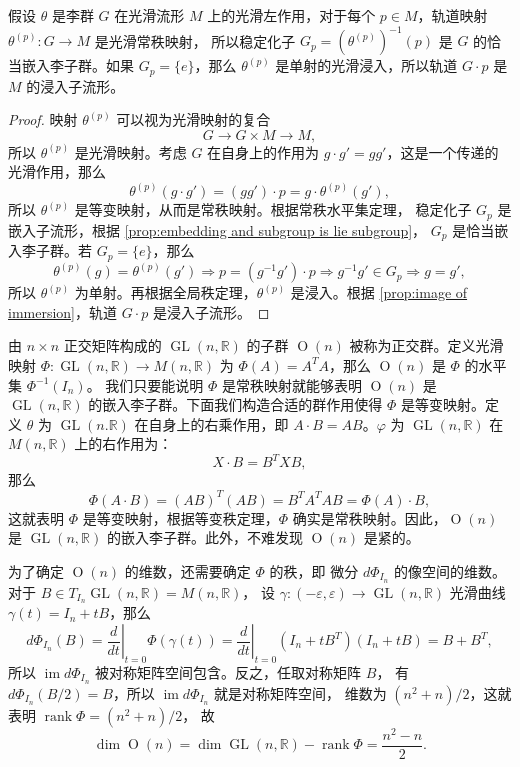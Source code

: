 \documentclass[fontset=none]{Notes}
\DeclareMathOperator\im{im}
\DeclareMathOperator\GL{GL}
\DeclareMathOperator\Orth{O}
\DeclareMathOperator\rk{rank}
\begin{document}
\begin{proposition}[轨道映射的性质]
  假设 $\theta$ 是李群 $G$ 在光滑流形 $M$ 上的光滑左作用，对于每个
  $p\in M$，轨道映射 $\theta^{(p)}:G\to M$ 是光滑常秩映射，
  所以稳定化子 $G_p=\left(\theta^{(p)}\right)^{-1}(p)$
  是 $G$ 的恰当嵌入李子群。如果 $G_p=\{e\}$，那么
  $\theta^{(p)}$ 是单射的光滑浸入，所以轨道 $G\cdot p$
  是 $M$ 的浸入子流形。
\end{proposition}
\begin{proof}
  映射 $\theta^{(p)}$ 可以视为光滑映射的复合
  \[
    G\to G\times M\to M,  
  \]
  所以 $\theta^{(p)}$ 是光滑映射。考虑 $G$ 在自身上的作用为
  $g\cdot g'=gg'$，这是一个传递的光滑作用，那么
  \[
    \theta^{(p)}(g\cdot g')=(gg')\cdot p=g\cdot \theta^{(p)}(g'),  
  \]
  所以 $\theta^{(p)}$ 是等变映射，从而是常秩映射。根据常秩水平集定理，
  稳定化子 $G_p$ 是嵌入子流形，根据 \autoref{prop:embedding and subgroup is lie subgroup}，
  $G_p$ 是恰当嵌入李子群。若 $G_p=\{e\}$，那么
  \[
    \theta^{(p)}(g)=\theta^{(p)}(g')\Rightarrow
    p=(g^{-1}g')\cdot p\Rightarrow g^{-1}  g'\in G_p
    \Rightarrow g=g',
  \]
  所以 $\theta^{(p)}$ 为单射。再根据全局秩定理，$\theta^{(p)}$
  是浸入。根据 \autoref{prop:image of immersion}，轨道 $G\cdot p$
  是浸入子流形。
\end{proof}

\begin{example}[正交群]\label{exa:orthogonal group}
  由 $n\times n$ 正交矩阵构成的 $\GL(n,\mathbb{R})$ 的子群 
  $\Orth(n)$ 被称为正交群。定义光滑映射 $\varPhi:\GL(n,\mathbb{R})\to M(n,\mathbb{R})$
  为 $\varPhi(A)=A^TA$，那么 $\Orth(n)$ 是 $\varPhi$ 的水平集 $\varPhi^{-1}(I_n)$。
  我们只要能说明 $\varPhi$ 是常秩映射就能够表明 $\Orth(n)$ 是 
  $\GL(n,\mathbb{R})$ 的嵌入李子群。下面我们构造合适的群作用使得
  $\varPhi$ 是等变映射。定义 $\theta$ 为 $\GL(n.\mathbb{R})$
  在自身上的右乘作用，即 $A\cdot B=AB$。$\varphi$
  为 $\GL(n,\mathbb{R})$ 在 $M(n,\mathbb{R})$ 上的右作用为：
  \[
    X\cdot B=B^TXB,  
  \]
  那么
  \[
    \varPhi(A\cdot B)=(AB)^T(AB)=B^TA^TAB=\varPhi(A)\cdot B ,
  \]
  这就表明 $\varPhi$ 是等变映射，根据等变秩定理，$\varPhi$
  确实是常秩映射。因此，$\Orth(n)$ 是 $\GL(n,\mathbb{R})$
  的嵌入李子群。此外，不难发现 $\Orth(n)$ 是紧的。

  为了确定 $\Orth(n)$ 的维数，还需要确定 $\varPhi$ 的秩，即
  微分 $d\varPhi_{I_n}$ 的像空间的维数。对于 $B\in T_{I_n}\GL(n,\mathbb{R})=M(n,\mathbb{R})$，
  设 $\gamma:(-\varepsilon,\varepsilon)\to \GL(n,\mathbb{R})$ 
  光滑曲线 $\gamma(t)=I_n+tB$，那么
  \[
    d\varPhi_{I_n}(B)=\left.\frac{d}{dt}\right|_{t=0}\varPhi(\gamma(t))
    =\left.\frac{d}{dt}\right|_{t=0}(I_n+tB^T)(I_n+tB)
    =B+B^T,
  \]
  所以 $\im d\varPhi_{I_n}$ 被对称矩阵空间包含。反之，任取对称矩阵 $B$，
  有 $d\varPhi_{I_n}(B/2)=B$，所以 $\im d\varPhi_{I_n}$ 就是对称矩阵空间，
  维数为 $(n^2+n)/2$，这就表明 $\rk \varPhi=(n^2+n)/2$，
  故
  \[
    \dim\Orth(n)=\dim\GL(n,\mathbb{R})-\rk \varPhi
    =\frac{n^2-n}{2}.
  \]
\end{example}
\end{document}
